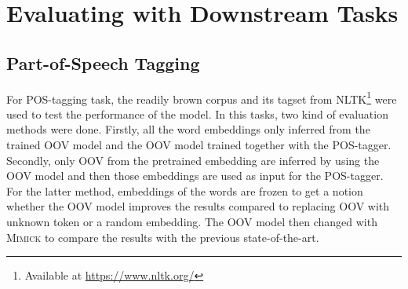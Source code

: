 
    
\section{Evaluating with Downstream Tasks}
    \subsection{Part-of-Speech Tagging}
        For POS-tagging task, the readily brown corpus and its tagset
        from NLTK\footnote{Available at \url{https://www.nltk.org/}}
        were used to test the performance of the model. In this tasks,
        two kind of evaluation methods were done. Firstly, all the
        word embeddings only inferred from the trained OOV model and
        the OOV model trained together with the POS-tagger. Secondly,
        only OOV from the pretrained embedding are inferred by using
        the OOV model and then those embeddings are used as input for
        the POS-tagger. For the latter method, embeddings of the words
        are frozen to get a notion whether the OOV model improves the
        results compared to replacing OOV with unknown token or a
        random embedding. The OOV model then changed with
        \textsc{Mimick} \citep{mimicking2017Pinter} to compare the
        results with the previous state-of-the-art.


